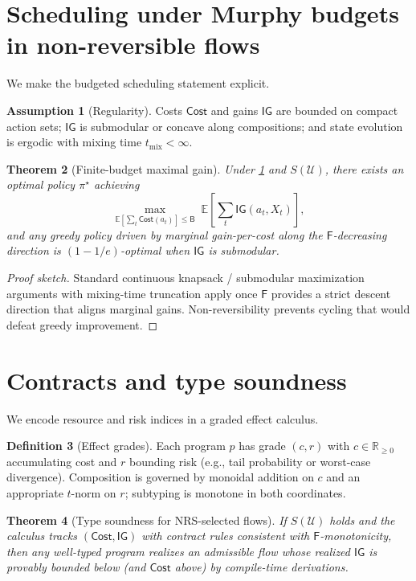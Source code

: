 \documentclass[11pt]{article}
\theoremstyle{plain}
\newtheorem{theorem}{Theorem}[section]
\theoremstyle{definition}
\newtheorem{definition}[theorem]{Definition}
\newtheorem{assumption}[theorem]{Assumption}
\theoremstyle{remark}
\newcommand{\EE}{\mathbb{E}}
\newcommand{\RR}{\mathbb{R}}
\newcommand{\1}{\mathds{1}}
\newcommand{\U}{\mathcal{U}}
\newcommand{\Budget}{\mathsf{B}}
\newcommand{\Cost}{\mathsf{Cost}}
\newcommand{\Gain}{\mathsf{IG}}
\newcommand{\Free}{\mathsf{F}}
\begin{document}
\section{Scheduling under Murphy budgets in non-reversible flows}
We make the budgeted scheduling statement explicit.

\begin{assumption}[Regularity]
\label{assump:regularity}
Costs $\Cost$ and gains $\Gain$ are bounded on compact action sets; $\Gain$ is submodular or concave along compositions; and state evolution is ergodic with mixing time $t_{\mathrm{mix}}<\infty$.
\end{assumption}

\begin{theorem}[Finite-budget maximal gain]
\label{thm:murphy}
Under \cref{assump:regularity} and $S(\U)$, there exists an optimal policy $\pi^\star$ achieving
\begin{equation}
\max_{\EE[\sum_t\Cost(a_t)]\le \Budget}\; \EE\!\left[\sum_{t}\Gain(a_t,X_t)\right],
\end{equation}
and any greedy policy driven by marginal gain-per-cost along the $\Free$-decreasing direction is $(1-1/e)$-optimal when $\Gain$ is submodular.
\end{theorem}

\begin{proof}[Proof sketch]
Standard continuous knapsack / submodular maximization arguments with mixing-time truncation apply once $\Free$ provides a strict descent direction that aligns marginal gains. Non-reversibility prevents cycling that would defeat greedy improvement.
\end{proof}

\section{Contracts and type soundness}
We encode resource and risk indices in a graded effect calculus.

\begin{definition}[Effect grades]
Each program $p$ has grade $(c,r)$ with $c\in\RR_{\ge0}$ accumulating cost and $r$ bounding risk (e.g., tail probability or worst-case divergence). Composition is governed by monoidal addition on $c$ and an appropriate $t$-norm on $r$; subtyping is monotone in both coordinates.
\end{definition}

\begin{theorem}[Type soundness for NRS-selected flows]
\label{thm:typesafety}
If $S(\U)$ holds and the calculus tracks $(\Cost,\Gain)$ with contract rules consistent with $\Free$-monotonicity, then any well-typed program realizes an admissible flow whose realized $\Gain$ is provably bounded below (and $\Cost$ above) by compile-time derivations.
\end{theorem}
\end{document}
